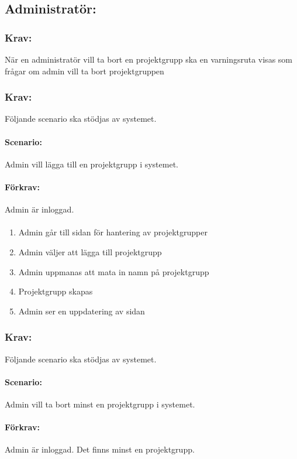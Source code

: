 \documentclass[paper=a4, fontsize=11pt,twoside]{article}
\begin{document}
	\subsection{Administratör:}
	\subsubsection{Krav:}
	När en administratör vill ta bort en projektgrupp ska en varningsruta visas som frågar om admin vill ta bort projektgruppen
	
	\subsubsection{Krav:} Följande scenario ska stödjas av systemet.
	\paragraph{Scenario:}
	Admin vill lägga till en projektgrupp i systemet.
	\paragraph{Förkrav:}
	Admin är inloggad.
	\paragraph{}
	\begin{enumerate}
		\item Admin går till sidan för hantering av projektgrupper
		\item Admin väljer att lägga till projektgrupp
		\item Admin uppmanas att mata in namn på projektgrupp
		\item Projektgrupp skapas
		\item Admin ser en uppdatering av sidan
	\end{enumerate}
	
	\subsubsection{Krav:} 
	Följande scenario ska stödjas av systemet.
	\paragraph{Scenario:}
	Admin vill ta bort minst en projektgrupp i systemet.
	\paragraph{Förkrav:}
	Admin är inloggad. Det finns minst en projektgrupp.
\end{document}
